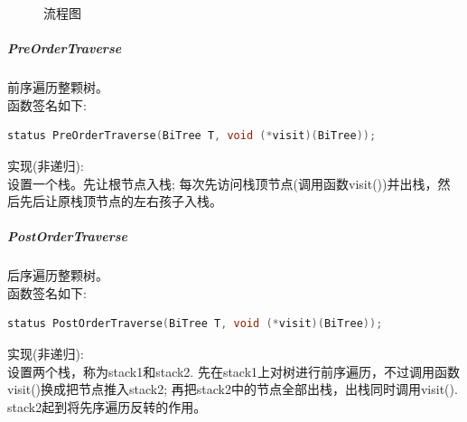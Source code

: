 \documentclass[supercite]{Experimental_Report}
\theoremstyle{definition}
\begin{document}
\begin{figure}[H]
	\centering
	\centering
	\caption{流程图}
	\label{fig6-9}
\end{figure}

\subparagraph{PreOrderTraverse}
\noindent
前序遍历整颗树。 \\
函数签名如下:
\begin{lstlisting}[language=C++, frame=single]
status PreOrderTraverse(BiTree T, void (*visit)(BiTree));
\end{lstlisting}
实现(非递归): \\
设置一个栈。先让根节点入栈; 每次先访问栈顶节点(调用函数visit())并出栈，然后先后让原栈顶节点的左右孩子入栈。 \\

\subparagraph{PostOrderTraverse}
\noindent
后序遍历整颗树。 \\
函数签名如下:
\begin{lstlisting}[language=C++, frame=single]
status PostOrderTraverse(BiTree T, void (*visit)(BiTree));
\end{lstlisting}
实现(非递归): \\
设置两个栈，称为stack1和stack2. 先在stack1上对树进行前序遍历，不过调用函数visit()换成把节点推入stack2; 再把stack2中的节点全部出栈，出栈同时调用visit(). stack2起到将先序遍历反转的作用。\\
\end{document}
